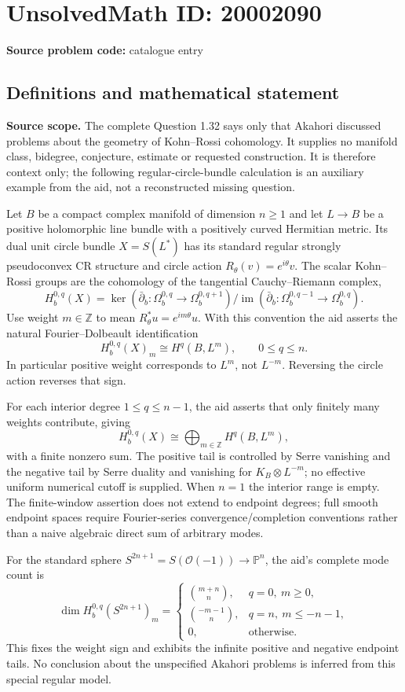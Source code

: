 \documentclass[11pt]{article}
\newcommand{\Z}{\mathbb{Z}}
\newcommand{\PP}{\mathbb{P}}
\begin{document}
\section*{UnsolvedMath ID: 20002090}
\textbf{Source problem code:} catalogue entry
\subsection{Definitions and mathematical statement}
\textbf{Source scope.} The complete Question 1.32 says only that Akahori discussed problems about the geometry of Kohn--Rossi cohomology. It supplies no manifold class, bidegree, conjecture, estimate or requested construction. It is therefore context only; the following regular-circle-bundle calculation is an auxiliary example from the aid, not a reconstructed missing question.

Let $B$ be a compact complex manifold of dimension $n\ge1$ and let $L\to B$ be a positive holomorphic line bundle with a positively curved Hermitian metric. Its dual unit circle bundle $X=S(L^*)$ has its standard regular strongly pseudoconvex CR structure and circle action $R_\theta(v)=e^{i\theta}v$. The scalar Kohn--Rossi groups are the cohomology of the tangential Cauchy--Riemann complex,
\[
 H_b^{0,q}(X)=\ker(\bar\partial_b:\Omega_b^{0,q}\to\Omega_b^{0,q+1})
          /\operatorname{im}(\bar\partial_b:\Omega_b^{0,q-1}\to\Omega_b^{0,q}).
\]
Use weight $m\in\Z$ to mean $R_\theta^*u=e^{im\theta}u$. With this convention the aid asserts the natural Fourier--Dolbeault identification
\[
 H_b^{0,q}(X)_m\cong H^q(B,L^m),\qquad 0\le q\le n.
\]
In particular positive weight corresponds to $L^m$, not $L^{-m}$. Reversing the circle action reverses that sign.

For each interior degree $1\le q\le n-1$, the aid asserts that only finitely many weights contribute, giving
\[
 H_b^{0,q}(X)\cong\bigoplus_{m\in\Z}H^q(B,L^m),
\]
with a finite nonzero sum. The positive tail is controlled by Serre vanishing and the negative tail by Serre duality and vanishing for $K_B\otimes L^{-m}$; no effective uniform numerical cutoff is supplied. When $n=1$ the interior range is empty. The finite-window assertion does not extend to endpoint degrees; full smooth endpoint spaces require Fourier-series convergence/completion conventions rather than a naive algebraic direct sum of arbitrary modes.

For the standard sphere $S^{2n+1}=S(\mathcal O(-1))\to\PP^n$, the aid's complete mode count is
\[
 \dim H_b^{0,q}(S^{2n+1})_m=
 \begin{cases}
 \binom{m+n}{n},&q=0,\ m\ge0,\\
 \binom{-m-1}{n},&q=n,\ m\le-n-1,\\
 0,&\text{otherwise}.
 \end{cases}
\]
This fixes the weight sign and exhibits the infinite positive and negative endpoint tails. No conclusion about the unspecified Akahori problems is inferred from this special regular model.
\end{document}
